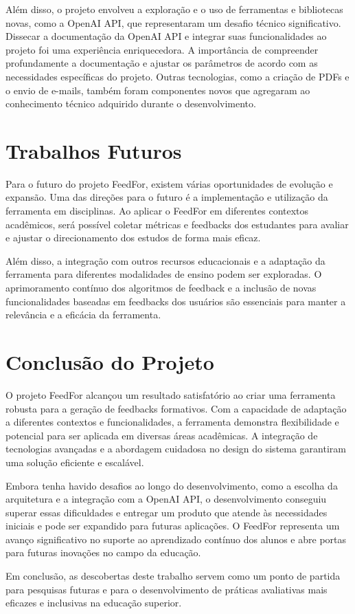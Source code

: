 Além disso, o projeto envolveu a exploração e o uso de ferramentas e bibliotecas novas, como a OpenAI API, que representaram um desafio técnico significativo. Dissecar a documentação da OpenAI API e integrar suas funcionalidades ao projeto foi uma experiência enriquecedora. A importância de compreender profundamente a documentação e ajustar os parâmetros de acordo com as necessidades específicas do projeto. Outras tecnologias, como a criação de PDFs e o envio de e-mails, também foram componentes novos que agregaram ao conhecimento técnico adquirido durante o desenvolvimento.

\section{Trabalhos Futuros}

Para o futuro do projeto FeedFor, existem várias oportunidades de evolução e expansão. Uma das direções para o futuro é a implementação e utilização da ferramenta em disciplinas. Ao aplicar o FeedFor em diferentes contextos acadêmicos, será possível coletar métricas e feedbacks dos estudantes para avaliar e ajustar o direcionamento dos estudos de forma mais eficaz.

Além disso, a integração com outros recursos educacionais e a adaptação da ferramenta para diferentes modalidades de ensino podem ser exploradas. O aprimoramento contínuo dos algoritmos de feedback e a inclusão de novas funcionalidades baseadas em feedbacks dos usuários são essenciais para manter a relevância e a eficácia da ferramenta.

\section{Conclusão do Projeto}

O projeto FeedFor alcançou um resultado satisfatório ao criar uma ferramenta robusta para a geração de feedbacks formativos. Com a capacidade de adaptação a diferentes contextos e funcionalidades, a ferramenta demonstra flexibilidade e potencial para ser aplicada em diversas áreas acadêmicas. A integração de tecnologias avançadas e a abordagem cuidadosa no design do sistema garantiram uma solução eficiente e escalável.

Embora tenha havido desafios ao longo do desenvolvimento, como a escolha da arquitetura e a integração com a OpenAI API, o desenvolvimento conseguiu superar essas dificuldades e entregar um produto que atende às necessidades iniciais e pode ser expandido para futuras aplicações. O FeedFor representa um avanço significativo no suporte ao aprendizado contínuo dos alunos e abre portas para futuras inovações no campo da educação.

Em conclusão, as descobertas deste trabalho servem como um ponto de partida para pesquisas futuras e para o desenvolvimento de práticas avaliativas mais eficazes e inclusivas na educação superior.